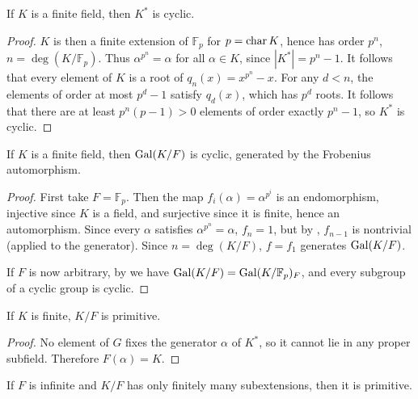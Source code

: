 \begin{lemma} If $K$ is a finite field, then $K^\ast$ is cyclic.
\label{fin_cyclic}
\end{lemma}

\begin{proof} $K$ is then a finite extension of $\mathbb{F}_p$ for $p =
\operatorname{\text{char}}{K}$, hence has order $p^n$, $n = \deg(K/\mathbb{F}_p)$.  Thus
$\alpha^{p^n} = \alpha$ for all $\alpha \in K$, since $|K^\ast| = p^n - 1$.
It follows that every element of $K$ is a root of $q_n(x) = x^{p^n} - x$.  For
any $d < n$, the elements of order at most $p^d - 1$ satisfy $q_d(x)$, which has
$p^d$ roots.  It follows that there are at least $p^n(p - 1) > 0$ elements of
order exactly $p^n - 1$, so $K^\ast$ is cyclic. \end{proof}

\begin{corollary} If $K$ is a finite field, then $\operatorname{\text{Gal}}(K/F)$ is cyclic, generated by
the Frobenius automorphism.
\label{fin_gal_cyclic}
\end{corollary}

\begin{proof} First take $F = \mathbb{F}_p$.  Then the map $f_i(\alpha) =
\alpha^{p^i}$ is an endomorphism, injective since $K$ is a field, and
surjective since it is finite, hence an automorphism.  Since every $\alpha$
satisfies $\alpha^{p^n} = \alpha$, $f_n = 1$, but by , $f_{n -
1}$ is nontrivial (applied to the generator).  Since $n = \deg(K/F)$, $f =
f_1$ generates $\operatorname{\text{Gal}}(K/F)$.

If $F$ is now arbitrary, by  we have $\operatorname{\text{Gal}}(K/F) =
\operatorname{\text{Gal}}(K/\mathbb{F}_p)_F$, and every subgroup of a cyclic group is cyclic.
\end{proof}

\begin{corollary} If $K$ is finite, $K/F$ is primitive.
\label{fin_prim_elt}
\end{corollary}

\begin{proof} No element of $G$ fixes the generator $\alpha$ of $K^\ast$, so
it cannot lie in any proper subfield.  Therefore $F(\alpha) = K$. \end{proof}

\begin{proposition} If $F$ is infinite and $K/F$ has only finitely many subextensions, then it is
primitive.
\label{gen_prim_elt}
\end{proposition}

